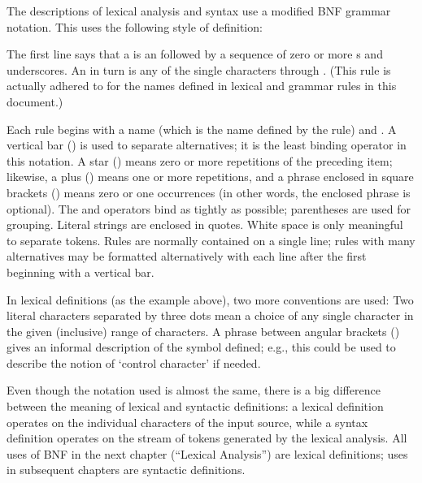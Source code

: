 The descriptions of lexical analysis and syntax use a modified BNF
grammar notation.  This uses the following style of definition:

\begin{productionlist}
\end{productionlist}

The first line says that a  is an  followed by
a sequence of zero or more s and underscores.  An
 in turn is any of the single characters 
through .  (This rule is actually adhered to for the
names defined in lexical and grammar rules in this document.)

Each rule begins with a name (which is the name defined by the rule)
and \code{::=}.  A vertical bar (\code{|}) is used to separate
alternatives; it is the least binding operator in this notation.  A
star (\code{*}) means zero or more repetitions of the preceding item;
likewise, a plus (\code{+}) means one or more repetitions, and a
phrase enclosed in square brackets (\code{[ ]}) means zero or one
occurrences (in other words, the enclosed phrase is optional).  The
\code{*} and \code{+} operators bind as tightly as possible;
parentheses are used for grouping.  Literal strings are enclosed in
quotes.  White space is only meaningful to separate tokens.
Rules are normally contained on a single line; rules with many
alternatives may be formatted alternatively with each line after the
first beginning with a vertical bar.

In lexical definitions (as the example above), two more conventions
are used: Two literal characters separated by three dots mean a choice
of any single character in the given (inclusive) range of \ASCII{}
characters.  A phrase between angular brackets () gives an
informal description of the symbol defined; e.g., this could be used
to describe the notion of `control character' if needed.

Even though the notation used is almost the same, there is a big
difference between the meaning of lexical and syntactic definitions:
a lexical definition operates on the individual characters of the
input source, while a syntax definition operates on the stream of
tokens generated by the lexical analysis.  All uses of BNF in the next
chapter (``Lexical Analysis'') are lexical definitions; uses in
subsequent chapters are syntactic definitions.
